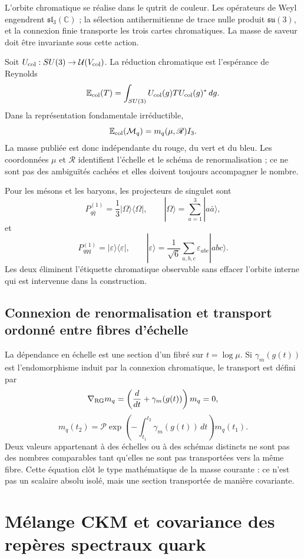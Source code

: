 L'orbite chromatique se réalise dans le qutrit de couleur. Les opérateurs de Weyl
engendrent \(\mathfrak{sl}_3(\mathbb C)\) ; la sélection antihermitienne de trace
nulle produit \(\mathfrak{su}(3)\), et la connexion finie transporte les trois
cartes chromatiques. La masse de saveur doit être invariante sous cette action.

Soit \(U_{\rm col}:SU(3)\to\mathcal U(V_{\rm col})\). La réduction chromatique
est l'espérance de Reynolds
\[
 \mathbb E_{\rm col}(T)
 =\int_{SU(3)}U_{\rm col}(g)T U_{\rm col}(g)^*\,dg.
\]
Dans la représentation fondamentale irréductible,
\[
 \mathbb E_{\rm col}(\mathcal M_q)
 =m_q(\mu,\mathscr R)I_3.
\]
La masse publiée est donc indépendante du rouge, du vert et du bleu. Les
coordonnées \(\mu\) et \(\mathscr R\) identifient l'échelle et le schéma de
renormalisation ; ce ne sont pas des ambiguïtés cachées et elles doivent toujours accompagner le
nombre.

Pour les mésons et les baryons, les projecteurs de singulet sont
\[
 P_{q\bar q}^{(1)}
 =\frac1{3}|\Omega\rangle\langle\Omega|,
 \qquad
 |\Omega\rangle=\sum_{a=1}^{3}|a\bar a\rangle,
\]
et
\[
 P_{qqq}^{(1)}
 =|\varepsilon\rangle\langle\varepsilon|,
 \qquad
 |\varepsilon\rangle
 =\frac1{\sqrt6}\sum_{a,b,c}\varepsilon_{abc}|abc\rangle.
\]
Les deux éliminent l'étiquette chromatique observable sans effacer l'orbite interne
qui est intervenue dans la construction.

\subsection{Connexion de renormalisation et transport ordonné entre fibres d'échelle}

La dépendance en échelle est une section d'un fibré sur
\(t=\log\mu\). Si \(\gamma_m(g(t))\) est l'endomorphisme induit par la
connexion chromatique, le transport est défini par
\[
 \nabla_{\rm RG}m_q
 =\left(\frac{d}{dt}+\gamma_m(g(t))\right)m_q=0,
\]
\[
 m_q(t_2)
 =\mathcal P\exp\!\left(-\int_{t_1}^{t_2}
 \gamma_m(g(t))\,dt\right)m_q(t_1).
\]
Deux valeurs appartenant à des échelles ou à des schémas distincts ne sont pas des nombres
comparables tant qu'elles ne sont pas transportées vers la même fibre. Cette équation clôt le
type mathématique de la masse courante : ce n'est pas un scalaire absolu isolé, mais
une section transportée de manière covariante.

\section{Mélange CKM et covariance des repères spectraux quark}

